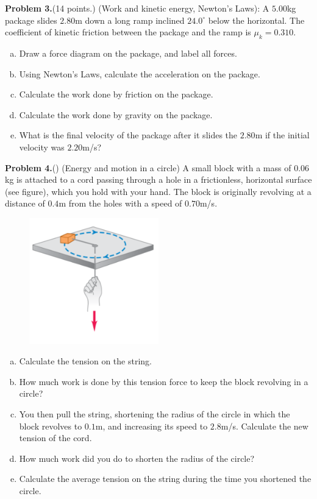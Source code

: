 \documentclass[12pt]{article}
\begin{document}
\newpage
{\bf Problem 3.}(14 points.) (Work and kinetic energy, Newton's Laws):
A $5.00$kg package slides $2.80$m down a long ramp inclined $24.0^\circ$ below the horizontal. The coefficient of kinetic friction between the package and the ramp is $\mu_k = 0.310$. 
\begin{enumerate}[(a)]
\item Draw a force diagram on the package, and label all forces.
\bigskip
\bigskip
\bigskip
\bigskip
\bigskip
\bigskip
\bigskip
\item Using Newton's Laws, calculate the acceleration on the package.
\bigskip
\bigskip
\bigskip
\bigskip
\bigskip
\bigskip
\bigskip
\item Calculate the work done by friction on the package.
\bigskip
\bigskip
\bigskip
\bigskip
\bigskip
\bigskip
\bigskip
\item Calculate the work done by gravity on the package.
\bigskip
\bigskip
\bigskip
\bigskip
\bigskip
\bigskip
\bigskip
\item What is the final velocity of the package after it slides the $2.80$m if the initial velocity was $2.20$m/s?
\bigskip
\bigskip
\bigskip
\end{enumerate}
\newpage
{\bf Problem 4.}() (Energy and motion in a circle)
A small block with a mass of $0.06$kg is attached to a cord passing through a hole in a frictionless, horizontal surface (see figure), which you hold with your hand. The block is originally revolving at a distance of $0.4$m from the holes with a speed of $0.70$m/s. 
\begin{figure}[!ht]
  \centering
    \includegraphics[width=0.5\textwidth]{figure1.png}
\end{figure}
\begin{enumerate}[(a)]
\item Calculate the tension on the string.
\bigskip
\bigskip
\bigskip
\bigskip
\bigskip
\item How much work is done by this tension force to keep the block revolving in a circle?
\bigskip
\bigskip
\bigskip
\bigskip
\bigskip
\item You then pull the string, shortening the radius of the circle in which the block revolves to $0.1$m, and increasing its speed to $2.8$m/s. Calculate the new tension of the cord.
\bigskip
\bigskip
\bigskip
\bigskip
\bigskip
\item How much work did you do to shorten the radius of the circle?
\bigskip
\bigskip
\bigskip
\bigskip
\bigskip
\item Calculate the average tension on the string during the time you shortened the circle. 
\bigskip
\bigskip
\bigskip
\bigskip
\bigskip
\end{enumerate}
\end{document}
